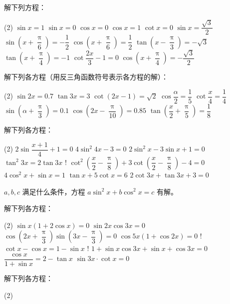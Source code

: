 \begin{Exercise}
\begin{question}
  \item 解下列方程：
  \begin{tasks}(2)
    \task $\sin x=1$
    \task $\sin x=0$
    \task $\cos x=0$
    \task $\cos x=1$
    \task $\cot x=0$
    \task $\sin x=\dfrac{\sqrt{3}}{2}$
    \task $\sin\left(x+\dfrac{\uppi}{6}\right)=-\dfrac{1}{2}$
    \task* $\cos\left(x+\dfrac{\uppi}{6}\right)=\dfrac{1}{2}$
    \task $\tan \left(x-\dfrac{\uppi}{3}\right)=-\sqrt{3}$
    \task $\tan \left(x+\dfrac{\uppi}{4}\right)=-1$
    \task $\cot \dfrac{2x}{3}-1=0$
    \task $\cos\left(x+\dfrac{\uppi}{4}\right)=-\dfrac{\sqrt{3}}{2}$
  \end{tasks}
  \item 解下列各方程（用反三角函数符号表示各方程的解）：
  \begin{tasks}(2)
    \task $\sin2x=0.7$
    \task $\tan 3x=3$
    \task $\cot (2x-1)=\sqrt{2}$
    \task $\cos\dfrac{\alpha}{2}=\dfrac{1}{5}$
    \task $\cot \dfrac{x}{4}=\dfrac{1}{4}$
    \task $\sin\left(\alpha+\dfrac{\uppi}{3}\right)=0.1$
    \task $\cos\left(2x-\dfrac{\uppi}{10}\right)=0.85$
    \task $\tan \left(\dfrac{x}{2}+\dfrac{\uppi}{5}\right)=\dfrac{1}{8}$
  \end{tasks}
  \item 解下列各方程：
  \begin{tasks}(2)
    \task $2 \sin \dfrac{x+1}{4}+1=0$
    \task $4 \sin ^{2} 4 x-3=0$
    \task $2 \sin ^{2} x-3 \sin x+1=0$
    \task $\tan ^{2} 3 x=2 \tan  3 x$
    \task! $\cot^{2}\left(\dfrac{x}{2}-\dfrac{\uppi}{8}\right)+3 \cot\left(\dfrac{x}{2}-\dfrac{\uppi}{8}\right)-4=0$
    \task  $4 \cos ^{2} x+\sin x=1$
    \task  $\tan  x+5 \cot x=6$
    \task  $2 \cot 3 x+\tan  3 x+3=0$
  \end{tasks}
  \item $a,b,c$ 满足什么条件，方程 $a\sin^2 x+b\cos^2 x=c$ 有解。
  \item 解下列各方程：
  \begin{tasks}(2)
    \task  $\sin x(1+2 \cos x)=0$
    \task  $\sin 2 x \cos 3 x=0$
    \task  $\cos \left(2 x+\dfrac{\uppi}{3}\right) \sin \left(3 x-\dfrac{\uppi}{3}\right)=0$
    \task  $\cos 5 x(1+\cos 2 x)=0$
    \task! $\cot x-\cos x=1-\sin x$
    \task! $1+\sin x \cos 3 x+\sin x+\cos 3 x=0$
    \task  $\dfrac{\cos x}{1+\sin x}=2-\tan x$
    \task  $\sin 3 x \cdot \cot x=0$
  \end{tasks} 
  \item 解下列各方程：
  \begin{tasks}(2)

\end{tasks}
\end{question}
\end{Exercise}
